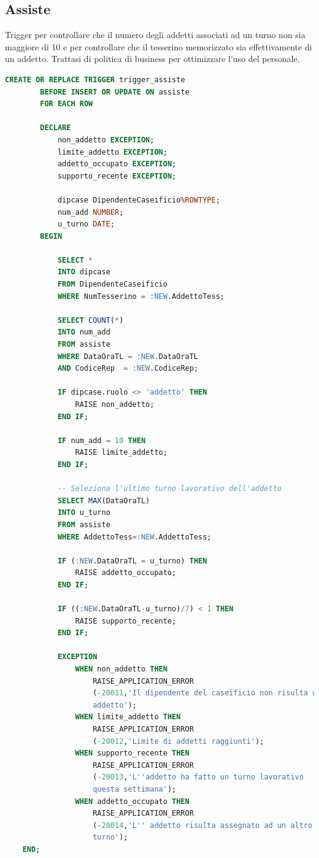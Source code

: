 \documentclass[12pt]{report}
\begin{document}
\subsection*{Assiste}
Trigger per controllare che il numero degli addetti associati ad un turno non sia maggiore di 10 e per controllare che il tesserino memorizzato sia effettivamente di un addetto. Trattasi di politica di business per ottimizzare l'uso del personale.
\begin{lstlisting}[language=SQL,caption={TR\_ASSISTE}]
	CREATE OR REPLACE TRIGGER trigger_assiste
		BEFORE INSERT OR UPDATE ON assiste
		FOR EACH ROW

		DECLARE 
			non_addetto EXCEPTION;
			limite_addetto EXCEPTION;
			addetto_occupato EXCEPTION;
			supporto_recente EXCEPTION;

			dipcase DipendenteCaseificio%ROWTYPE;
			num_add NUMBER;
			u_turno DATE;
		BEGIN

			SELECT *
			INTO dipcase
			FROM DipendenteCaseificio
			WHERE NumTesserino = :NEW.AddettoTess;

			SELECT COUNT(*)
			INTO num_add
			FROM assiste
			WHERE DataOraTL = :NEW.DataOraTL
			AND CodiceRep  = :NEW.CodiceRep;

			IF dipcase.ruolo <> 'addetto' THEN
				RAISE non_addetto;
			END IF;

			IF num_add = 10 THEN
				RAISE limite_addetto;
			END IF;

			-- Seleziona l'ultimo turno lavorativo dell'addetto
			SELECT MAX(DataOraTL)
			INTO u_turno
			FROM assiste
			WHERE AddettoTess=:NEW.AddettoTess;

			IF (:NEW.DataOraTL = u_turno) THEN
				RAISE addetto_occupato;
			END IF;

			IF ((:NEW.DataOraTL-u_turno)/7) < 1 THEN
				RAISE supporto_recente;
			END IF;

			EXCEPTION
				WHEN non_addetto THEN
					RAISE_APPLICATION_ERROR
					(-20011,'Il dipendente del caseificio non risulta un 
					addetto');
				WHEN limite_addetto THEN
					RAISE_APPLICATION_ERROR
					(-20012,'Limite di addetti raggiunti');
				WHEN supporto_recente THEN
					RAISE_APPLICATION_ERROR
					(-20013,'L''addetto ha fatto un turno lavorativo 
					questa settimana');
				WHEN addetto_occupato THEN
					RAISE_APPLICATION_ERROR
					(-20014,'L'' addetto risulta assegnato ad un altro 
					turno');
	END;
\end{lstlisting}
\end{document}
